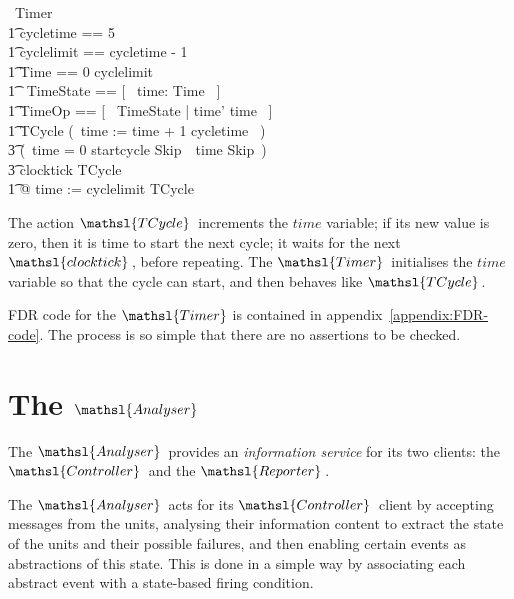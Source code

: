 \documentclass{report}
\newcommand{\processname}[1]{\mathsl{#1}}
\begin{document}
\begin{circus}
   \circprocess\ Timer ~\circdef~ \circbegin \\
     \t1 cycletime == 5 \\ %
     \t1 cyclelimit == cycletime - 1 \\ %
     \t1 Time == 0 \upto cyclelimit \\
     \t1 \circstate\ TimeState == [~ time: Time ~] \\ %
     \t1 TimeOp == [~ \Delta TimeState | time' \geq time ~] \\
     \t1 TCycle \circdef (~time := time + 1 \mod cycletime ~) \circseq \\ %
            \t3 (\circif\       time = 0 \circthen startcycle \then Skip\ \circelse\ time  \circthen Skip\ \circfi) \circseq \\ %
            \t3 clocktick \then TCycle
            \\
      \t1 @ time := cyclelimit \circseq TCycle \\
   \circend
\end{circus}
The action \( \processname{TCycle}\, \)\/ increments the \( time \)\/
variable; if its new value is zero, then it is time to start the next
cycle; it waits for the next \( \mathsl{clocktick}\, \), before
repeating. The \( \processname{Timer}\, \)\/ initialises the \( time \)\/
variable so that the cycle can start, and then behaves like \(
\processname{TCycle}\, \).

FDR code for the \( \mathsl{Timer} \)\/ is contained in
appendix~\ref{appendix:FDR-code}.  The process is so simple that there
are no assertions to be checked.


\chapter{The $\mathsl{Analyser}$}

The \( \mathsl{Analyser} \, \)\/ provides an \emph{information
  service} for its two clients: the \( \mathsl{Controller} \, \)\/ and
the \( \mathsl{Reporter} \, \).

The \( \mathsl{Analyser} \, \)\/ acts for its \( \mathsl{Controller}
\, \)\/ client by accepting messages from the units, analysing their
information content to extract the state of the units and their
possible failures, and then enabling certain events as abstractions of
this state.  This is done in a simple way by associating each abstract
event with a state-based firing condition.
\end{document}
